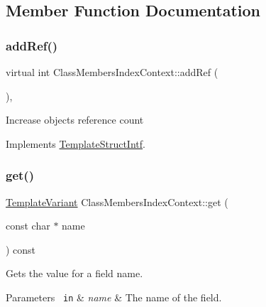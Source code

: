 \subsection{Member Function Documentation}
\mbox{\label{class_class_members_index_context_aee2107e3b581e26c374a76b102672a2e}} 
\subsubsection{\texorpdfstring{addRef()}{addRef()}}
{\footnotesize\ttfamily virtual int Class\+Members\+Index\+Context\+::add\+Ref (\begin{DoxyParamCaption}{ }\end{DoxyParamCaption})\hspace{0.3cm}{\ttfamily [inline]}, {\ttfamily [virtual]}}

Increase object\textquotesingle{}s reference count 

Implements \mbox{\hyperlink{class_template_struct_intf_a05fe97ad47633beb326f69686faed581}{Template\+Struct\+Intf}}.

\mbox{\label{class_class_members_index_context_a87447001049b9491690e4b8e04f7851f}} 
\subsubsection{\texorpdfstring{get()}{get()}}
{\footnotesize\ttfamily \mbox{\hyperlink{class_template_variant}{Template\+Variant}} Class\+Members\+Index\+Context\+::get (\begin{DoxyParamCaption}\item[{const char $\ast$}]{name }\end{DoxyParamCaption}) const\hspace{0.3cm}{\ttfamily [virtual]}}

Gets the value for a field name. 
\begin{DoxyParams}[1]{Parameters}
\mbox{\texttt{ in}}  & {\em name} & The name of the field. \\
\hline
\end{DoxyParams}


